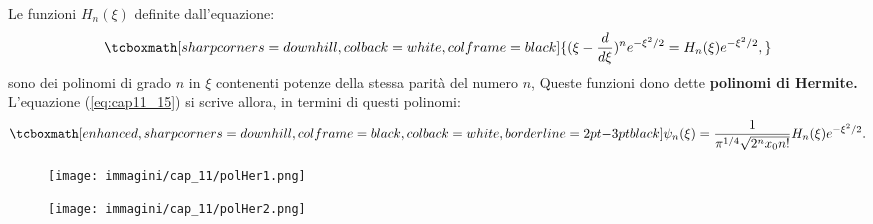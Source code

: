  Le funzioni $H_n({\xi})$ definite dall'equazione:
	\begin{equation}
		\tcboxmath[sharp corners=downhill, colback=white, colframe=black]{
			(\xi-\frac{d}{d\xi})^n e^{-\xi^2/2}=H_n(\xi)e^{-\xi^2/2},
			}
	\end{equation}
sono dei polinomi di grado $n$ in $\xi$ contenenti potenze della stessa parità del numero $n$, Queste funzioni dono dette \textbf{polinomi di Hermite.} L'equazione (\ref{eq:cap11_15}) si scrive allora, in termini di questi polinomi:
	\begin{equation}
		\tcboxmath[enhanced, sharp corners=downhill, colframe=black, colback=white, borderline={2pt}{-3pt}{black}]{
			\psi_n(\xi)=\frac{1}{\pi^{1/4}\sqrt{2^nx_0n!}} H_n(\xi)e^{-\xi^2/2}.
			}
	\end{equation}
\newpage
\begin{figure}[htbp]
\begin{center}
\texttt{[image: immagini/cap\_11/polHer1.png]}
\end{center}
\end{figure}

\begin{figure}[htbp]
\begin{center}
\texttt{[image: immagini/cap\_11/polHer2.png]}
\end{center}
\end{figure}
